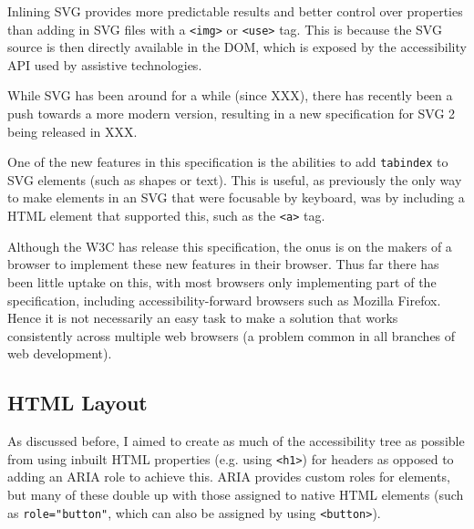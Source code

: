 \documentclass[ %
                    author={Aleena Baig},
                supervisor={Dr Simon Lock},
                    degree={BSc},
                     title={On Making Web Accessible Graphs},
                  subtitle={},
                      year={2019} ]{dissertation}
\begin{document}
Inlining SVG provides more predictable results and better control over properties than adding in SVG files with a \texttt{<img>} or \texttt{<use>} tag. This is because the SVG source is then directly available in the DOM, which is exposed by the accessibility API used by assistive technologies.

While SVG has been around for a while (since XXX), there has recently been a push towards a more modern version, resulting in a new specification for SVG 2 being released in XXX.

One of the new features in this specification is the abilities to add \texttt{tabindex} to SVG elements (such as shapes or text). This is useful, as previously the only way to make elements in an SVG that were focusable by keyboard, was by including a HTML element that supported this, such as the \texttt{<a>} tag.

Although the W3C has release this specification, the onus is on the makers of a browser to implement these new features in their browser. Thus far there has been little uptake on this, with most browsers only implementing part of the specification, including accessibility-forward browsers such as Mozilla Firefox. Hence it is not necessarily an easy task to make a solution that works consistently across multiple web browsers (a problem common in all branches of web development).



\subsection{HTML Layout}

As discussed before, I aimed to create as much of the accessibility tree as possible from using inbuilt HTML properties (e.g. using \texttt{<h1>}) for headers as opposed to adding an ARIA role to achieve this. ARIA provides custom roles for elements, but many of these double up with those assigned to native HTML elements (such as \texttt{role="button"}, which can also be assigned by using \texttt{<button>}).
\end{document}
